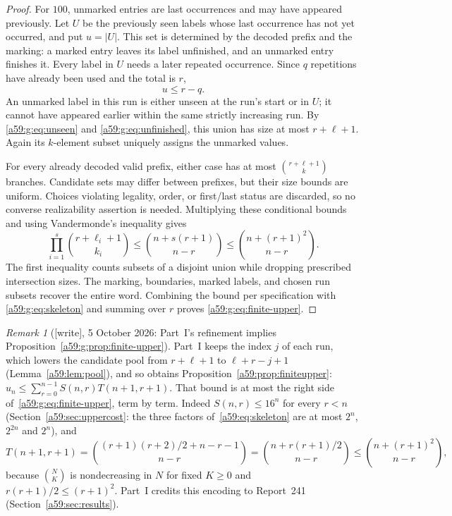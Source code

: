 \documentclass[11pt,letterpaper]{article}
\theoremstyle{remark}\newtheorem{remark}[theorem]{Remark}
\newcommand{\wtag}{\textup{[write]}}
\theoremstyle{remark}\newtheorem{wremark}{Remark}\renewcommand{\thewremark}{W\arabic{wremark}}
\theoremstyle{plain}\newtheorem{wcorollary}[wremark]{Corollary}
\begin{document}
\begin{proof}
For $100$, unmarked entries are last occurrences and may have appeared previously. Let $U$ be the previously seen labels whose last occurrence has not yet occurred, and put $u=|U|$. This set is determined by the decoded prefix and the marking: a marked entry leaves its label unfinished, and an unmarked entry finishes it. Every label in $U$ needs a later repeated occurrence. Since $q$ repetitions have already been used and the total is $r$,
\begin{equation}\label{a59:g:eq:unfinished}
 u\leq r-q.
\end{equation}
An unmarked label in this run is either unseen at the run's start or in $U$; it cannot have appeared earlier within the same strictly increasing run. By \eqref{a59:g:eq:unseen} and \eqref{a59:g:eq:unfinished}, this union has size at most $r+\ell+1$. Again its $k$-element subset uniquely assigns the unmarked values.

For every already decoded valid prefix, either case has at most $\binom{r+\ell+1}{k}$ branches. Candidate sets may differ between prefixes, but their size bounds are uniform. Choices violating legality, order, or first/last status are discarded, so no converse realizability assertion is needed. Multiplying these conditional bounds and using Vandermonde's inequality gives
\begin{equation}\label{a59:g:eq:vandermonde}
 \prod_{i=1}^s\binom{r+\ell_i+1}{k_i}
 \leq\binom{n+s(r+1)}{n-r}
 \leq\binom{n+(r+1)^2}{n-r}.
\end{equation}
The first inequality counts subsets of a disjoint union while dropping prescribed intersection sizes. The marking, boundaries, marked labels, and chosen run subsets recover the entire word. Combining the bound per specification with \eqref{a59:g:eq:skeleton} and summing over $r$ proves \eqref{a59:g:eq:finite-upper}.
\end{proof}

\begin{wremark}[\wtag, 5 October 2026: Part~I's refinement implies Proposition~\ref{a59:g:prop:finite-upper}]\label{a59:g:rem:upperimplied}
Part~I keeps the index $j$ of each run, which lowers the candidate pool
from $r+\ell+1$ to $\ell+r-j+1$ (Lemma~\ref{a59:lem:pool}), and so obtains
Proposition~\ref{a59:prop:finiteupper}:
$u_n\le\sum_{r=0}^{n-1}S(n,r)T(n+1,r+1)$. That bound is at most the right
side of~\eqref{a59:g:eq:finite-upper}, term by term. Indeed $S(n,r)\le16^n$
for every $r<n$ (Section~\ref{a59:sec:uppercost}: the three factors
of~\eqref{a59:eq:skeleton} are at most $2^n$, $2^{2n}$ and $2^n$), and
\[
 T(n+1,r+1)=\binom{(r+1)(r+2)/2+n-r-1}{n-r}=\binom{n+r(r+1)/2}{n-r}
 \le\binom{n+(r+1)^2}{n-r},
\]
because $\binom{N}{K}$ is nondecreasing in $N$ for fixed $K\ge0$ and
$r(r+1)/2\le(r+1)^2$. Part~I credits this encoding to Report~241
(Section~\ref{a59:sec:results}).
\end{wremark}
\end{document}
